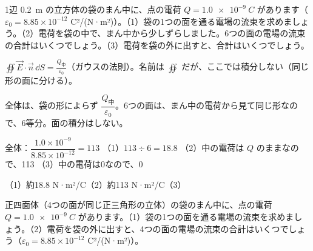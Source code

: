 \begin{reidai}
1辺 \qty{0.2}{m} の立方体の袋のまん中に、点の電荷 $Q=\qty{1.0e-9}{C}$ があります（$\varepsilon_0=8.85\times10^{-12}$ C²/(N·m²)）。（1）袋の1つの面を通る電場の流束を求めましょう。（2）電荷を袋の中で、まん中から少しずらしました。6つの面の電場の流束の合計はいくつでしょう。（3）電荷を袋の外に出すと、合計はいくつでしょう。\par
\kangaekata {}\par
{}\enspace $\oiint\vec E\cdot\vec n\,\dd S=\frac{Q_{\text{中}}}{\varepsilon_0}$（ガウスの法則）。名前は $\oiint$ だが、ここでは積分しない（同じ形の面に分ける）。\par
{}\enspace 全体は、袋の形によらず $\dfrac{Q_{\text{中}}}{\varepsilon_0}$。6つの面は、まん中の電荷から見て同じ形なので、6等分。面の積分はしない。\par
\shiki 全体：$\dfrac{1.0\times10^{-9}}{8.85\times10^{-12}}=113$\kviiilq
（1）$113\div6=18.8$\kviiilq
（2）中の電荷は $Q$ のままなので、113\kviiilq
（3）中の電荷は0なので、0\par
\kotae（1）\nobreak 約18.8 N·m²/C\quad（2）\nobreak 約113 N·m²/C\quad（3）
\end{reidai}

\begin{jibun}
正四面体（4つの面が同じ正三角形の立体）の袋のまん中に、点の電荷 $Q=\qty{1.0e-9}{C}$ があります。（1）袋の1つの面を通る電場の流束を求めましょう。（2）電荷を袋の外に出すと、4つの面の電場の流束の合計はいくつでしょう（$\varepsilon_0=8.85\times10^{-12}$ C²/(N·m²)）。
\end{jibun}

